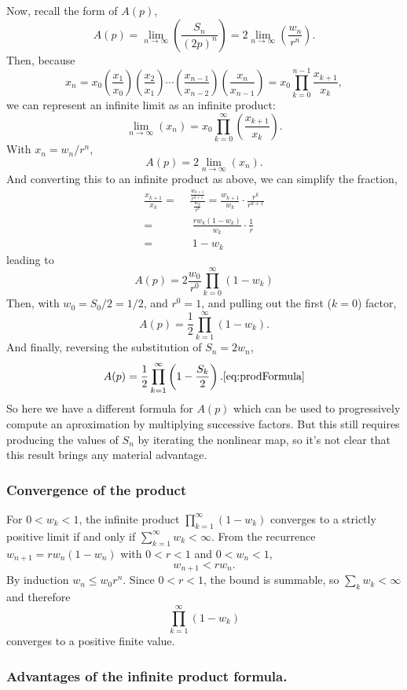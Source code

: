 \documentclass[11pt]{article}
\begin{document}
\noindent
Now, recall the form of $A(p)$,
$$A(p) = \lim_{n\to\infty} \left(\frac{S_n}{(2p)^n}\right) = 2\lim_{n\to\infty}\left(\frac{w_n}{r^n}\right).$$
Then, because
$$x_n = x_0\left(\frac{x_{1}}{x_{0}}\right)\left(\frac{x_{2}}{x_{1}}\right)\cdots\left(\frac{x_{n-1}}{x_{n-2}}\right)\left(\frac{x_{n}}{x_{n-1}}\right) = x_0\prod^{n-1}_{k=0} \frac{x_{k+1}}{x_k},$$
we can represent an infinite limit as an infinite product: 
$$\lim_{n\to\infty}(x_n) = x_0\prod^\infty_{k=0}\left(\frac{x_{k+1}}{x_k}\right).$$
With $x_n = w_n/r^n$,
$$A(p) = 2\lim_{n\to\infty}\left(x_n\right).$$
And converting this to an infinite product as above, we can simplify the fraction,
\begin{align*}
\frac{x_{k+1}}{x_k} =&\; \frac{\frac{w_{k+1}}{r^{k+1}}}{\frac{w_k}{r^k}} = \frac{w_{k+1}}{w_k}\cdot\frac{r^k}{r^{k+1}}\\
=& \;\;\frac{rw_k(1-w_k)}{w_k}\cdot\frac{1}{r}\\ 
=& \;\; 1-w_k
\end{align*}
leading to
$$A(p) = 2\frac{w_0}{r^0}\prod^\infty_{k=0}(1-w_k)$$
Then, with $w_0 = S_0/2 = 1/2$, and $r^0 = 1$, and pulling out the first ($k=0$) factor,
$$A(p) = \frac{1}{2}\prod^\infty_{k=1}\left(1-w_k\right).$$
And finally, reversing the substitution of $S_n = 2w_n$,
\begin{equation}
A(p) = \frac{1}{2}\prod_{k=1}^{\infty}\left(1-\frac{S_k}{2}\right).\label{eq:prodFormula}
\ref{eq:prodFormula}
\end{equation}
So here we have a different formula for $A(p)$ which can be used to progressively compute an aproximation by multiplying successive factors. But this still requires producing the values of $S_n$ by iterating the nonlinear map, so it's not clear that this result brings any material advantage. 


\subsubsection{Convergence of the product}
For $0<w_k<1$, the infinite product $\prod_{k=1}^{\infty}(1-w_k)$ converges to a strictly positive limit if and only if $\sum_{k=1}^{\infty}w_k<\infty$.
From the recurrence $w_{n+1}=r w_n(1-w_n)$ with $0<r<1$ and $0<w_n<1$,
\[
w_{n+1}<r w_n.
\]
By induction $w_n\le w_0 r^n$. Since $0<r<1$, the bound is summable, so $\sum_k w_k<\infty$ and therefore
\[
\prod_{k=1}^{\infty}(1-w_k)
\]
converges to a positive finite value.

\subsubsection{Advantages of the infinite product formula.}
\end{document}
